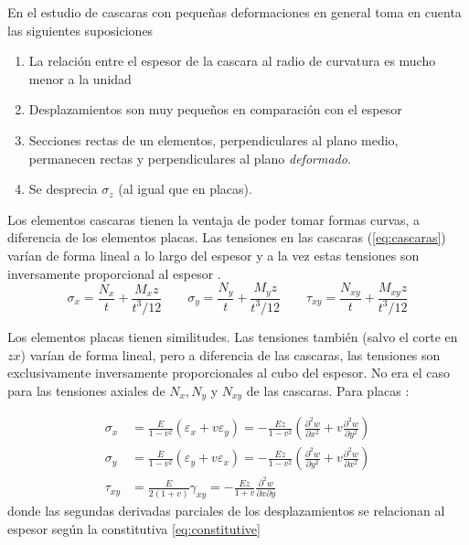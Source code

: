 \documentclass[onecolumn,10pt,titlepage]{article}
\begin{document}
En el estudio de cascaras con pequeñas deformaciones en general toma en cuenta las siguientes suposiciones\cite{ugural2003advanced}

\begin{enumerate}
	\item La relación entre el espesor de la cascara al radio de curvatura es mucho menor a la unidad
	\item Desplazamientos son muy pequeños en comparación con el espesor
	\item Secciones rectas de un elementos, perpendiculares al plano medio, permanecen rectas y perpendiculares al plano \textit{deformado}.
	\item Se desprecia $\sigma_z$ (al igual que en placas).
\end{enumerate}


Los elementos cascaras tienen la ventaja de poder tomar formas curvas, a diferencia de los elementos placas. Las tensiones en las cascaras (\ref{eq:cascaras}) varían de forma lineal a lo largo del espesor y a la vez estas tensiones son inversamente proporcional al espesor \citep{cook2007concepts}.\\
\begin{equation} \label{eq:cascaras}
\sigma_{x}=\frac{N_{x}}{t}+\frac{M_{x} z}{t^{3} / 12} \qquad \sigma_{y}=\frac{N_{y}}{t}+\frac{M_{y} z}{t^{3} / 12} \qquad \tau_{x y}=\frac{N_{x y}}{t}+\frac{M_{x y} z}{t^{3} / 12}
\end{equation}

Los elementos placas tienen similitudes. Las tensiones también (salvo el corte en $zx$) varían de forma lineal, pero a diferencia de las cascaras, las tensiones son exclusivamente inversamente proporcionales al cubo del espesor. No era el caso para las tensiones axiales de $N_x,N_y$ y $N_{xy}$ de las cascaras. Para placas \citep{ugural2003advanced}:

\begin{align} \sigma_{x} &=\frac{E}{1-v^{2}}\left(\varepsilon_{x}+v \varepsilon_{y}\right)=-\frac{E z}{1-v^{2}}\left(\frac{\partial^{2} w}{\partial x^{2}}+v \frac{\partial^{2} w}{\partial y^{2}}\right) \label{eq:sigxplacas}\\ \sigma_{y} &=\frac{E}{1-v^{2}}\left(\varepsilon_{y}+v \varepsilon_{x}\right)=-\frac{E z}{1-v^{2}}\left(\frac{\partial^{2} w}{\partial y^{2}}+v \frac{\partial^{2} w}{\partial x^{2}}\right) \\ \tau_{x y} &=\frac{E}{2(1+v)} \gamma_{x y}=-\frac{E z}{1+v} \frac{\partial^{2} w}{\partial x \partial y} 
\end{align}
donde las segundas derivadas parciales de los desplazamientos se relacionan al espesor según la constitutiva \ref{eq:constitutive}
\end{document}

